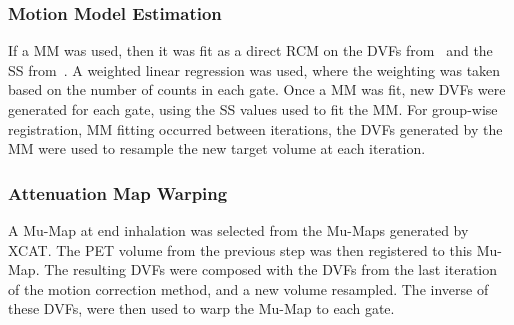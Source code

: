             \subsubsection{Motion Model Estimation} \label{sec:comparison_of_motion_correction_methods_incorporating_motion_modelling_for_pet_ct_using_a_single_breath_hold_attenuation_map_motion_model_estimation}
                If a \gls{MM} was used, then it was fit as a direct \gls{RCM} on the \glspl{DVF} from~ and the \gls{SS} from~. A weighted linear regression was used, where the weighting was taken based on the number of counts in each gate. Once a \gls{MM} was fit, new \glspl{DVF} were generated for each gate, using the \gls{SS} values used to fit the \gls{MM}. For group-wise registration, \gls{MM} fitting occurred between iterations, the \glspl{DVF} generated by the \gls{MM} were used to resample the new target volume at each iteration.
            
            \subsubsection{Attenuation Map Warping} \label{sec:comparison_of_motion_correction_methods_incorporating_motion_modelling_for_pet_ct_using_a_single_breath_hold_attenuation_map_attenuation_map_warping}
                A \gls{Mu-Map} at end inhalation was selected from the \glspl{Mu-Map} generated by \gls{XCAT}. The \gls{PET} volume from the previous step was then registered to this \gls{Mu-Map}. The resulting \glspl{DVF} were composed with the \glspl{DVF} from the last iteration of the motion correction method, and a new volume resampled. The inverse of these \glspl{DVF}, were then used to warp the \gls{Mu-Map} to each gate.
            
